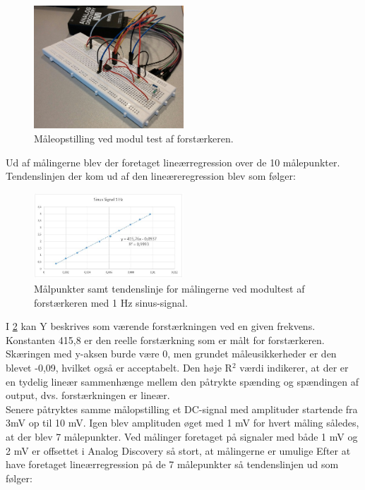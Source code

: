 \begin{figure}[H]
	\centering
	\includegraphics[width=0.5\textwidth]{Figurer/Hardware/ForstaerkerTest}
	\caption{Måleopstilling ved modul test af forstærkeren.}
	\label{fig:ForstaerkerTest}
\end{figure}

Ud af målingerne blev der foretaget lineærregression over de 10 målepunkter. Tendenslinjen der kom ud af den lineæreregression blev som følger:

\begin{figure}[H]
	\centering
	\includegraphics[width=0.5\textwidth]{Figurer/Hardware/Sinusforstaerker}
	\caption{Målpunkter samt tendenslinje for målingerne ved modultest af forstærkeren med 1 Hz sinus-signal.}
	\label{fig:SinusModul}
\end{figure}


I \ref{fig:SinusModul} kan Y beskrives som værende forstærkningen ved en given frekvens. Konstanten 415,8 er den reelle forstærkning som er målt for forstærkeren. Skæringen med y-aksen burde være 0, men grundet måleusikkerheder er den blevet -0,09, hvilket også er acceptabelt. Den høje R$^2$ værdi indikerer, at der er en tydelig lineær sammenhænge mellem den påtrykte spænding og spændingen af output, dvs. forstærkningen er lineær.\\
Senere påtryktes samme målopstilling et DC-signal med amplituder startende fra 3mV op til 10 mV. Igen blev amplituden øget med 1 mV for hvert måling således, at der blev 7 målepunkter. Ved målinger foretaget på signaler med både 1 mV og 2 mV er offsettet i Analog Discovery så stort, at målingerne er umulige
Efter at have foretaget lineærregression på de 7 målepunkter så tendenslinjen ud som følger:

